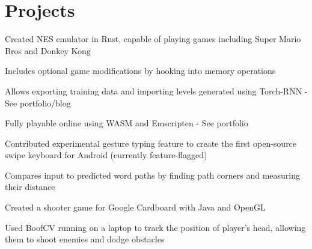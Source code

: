 \documentclass[]{deedy-resume-openfont}
\begin{document}
\begin{minipage}[t]{0.67\textwidth}
\section{Projects}

\begin{tightemize}
	\item Created NES emulator in Rust, capable of playing games including Super Mario Bros and Donkey Kong
	\item Includes optional game modifications by hooking into memory operations
	\item Allows exporting training data and importing levels generated using Torch-RNN - See portfolio/blog
	\item Fully playable online using WASM and Emscripten - See portfolio
\end{tightemize}
\sectionsep

\begin{tightemize}
\item Contributed experimental gesture typing feature to create the first open-source swipe keyboard for Android (currently feature-flagged)
\item Compares input to predicted word paths by finding path corners and measuring their distance
\end{tightemize}
\sectionsep

\begin{tightemize}
\item Created a shooter game for Google Cardboard with Java and OpenGL 
\item Used BoofCV running on a laptop to track the position of player’s head, allowing them to shoot enemies and dodge obstacles
\end{tightemize}
\sectionsep

\end{minipage} 
\end{document}
